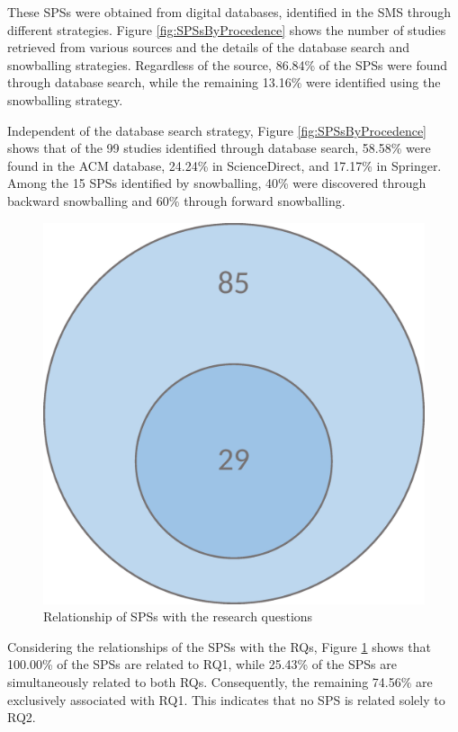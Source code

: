 These SPSs were obtained from digital databases, identified in the SMS through different strategies. Figure \ref{fig:SPSsByProcedence} shows the number of studies retrieved from various sources and the details of the database search and snowballing strategies. Regardless of the source, 86.84\% of the SPSs were found through database search, while the remaining 13.16\% were identified using the snowballing strategy.

Independent of the database search strategy, Figure \ref{fig:SPSsByProcedence} shows that of the 99 studies identified through database search, 58.58\% were found in the ACM database, 24.24\% in ScienceDirect, and 17.17\% in Springer. Among the 15 SPSs identified by snowballing, 40\% were discovered through backward snowballing and 60\% through forward snowballing.

\begin{figure}[ht]
	\centering
	\includegraphics[scale=0.2]{resources/figures/Imagen2.eps}
	\caption{Relationship of SPSs with the research questions}
	\label{fig:SPSsByRQs}
\end{figure}

Considering the relationships of the SPSs with the RQs, Figure \ref{fig:SPSsByRQs} shows that 100.00\% of the SPSs are related to RQ1, while 25.43\% of the SPSs are simultaneously related to both RQs. Consequently, the remaining 74.56\% are exclusively associated with RQ1. This indicates that no SPS is related solely to RQ2.

